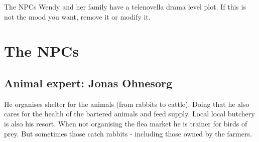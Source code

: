 The NPCs Wendy and her family have a telenovella drama level plot. If this is not the mood you want, remove it or modify it.

\chapter{The NPCs}

\section{Animal expert: Jonas Ohnesorg}

He organises shelter for the animals (from rabbits to cattle). Doing that he also cares for the health of the bartered animals and feed supply. Local local butchery is also his resort. When not organising the flea market he is trainer for birds of prey. But sometimes those catch rabbits - including those owned by the farmers.



